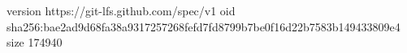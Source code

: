 version https://git-lfs.github.com/spec/v1
oid sha256:bae2ad9d68fa38a9317257268fefd7fd8799b7be0f16d22b7583b149433809e4
size 174940
